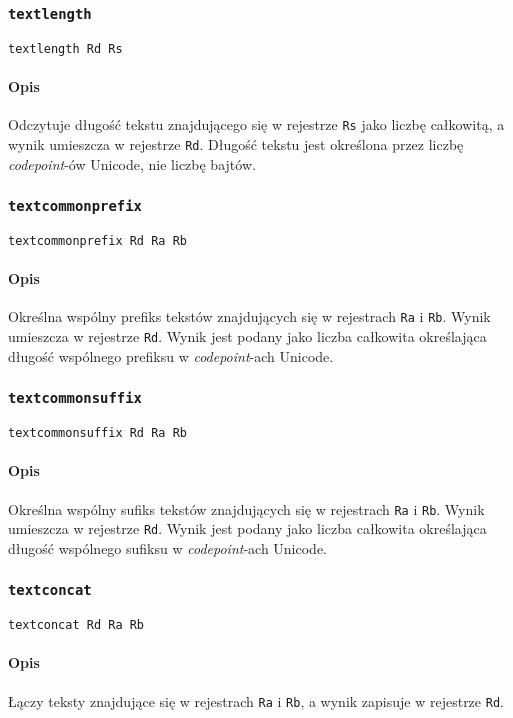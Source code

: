\subsubsection{\texttt{textlength}}

\begin{lstlisting}
textlength Rd Rs
\end{lstlisting}

\paragraph*{Opis} Odczytuje długość tekstu znajdującego się w rejestrze
\texttt{Rs} jako liczbę całkowitą, a wynik umieszcza w rejestrze \texttt{Rd}.
Długość tekstu jest określona przez liczbę \emph{codepoint}-ów Unicode, nie
liczbę bajtów.

\subsubsection{\texttt{textcommonprefix}}

\begin{lstlisting}
textcommonprefix Rd Ra Rb
\end{lstlisting}

\paragraph*{Opis} Określna wspólny prefiks tekstów znajdujących się w rejestrach
\texttt{Ra} i \texttt{Rb}. Wynik umieszcza w rejestrze \texttt{Rd}. Wynik jest
podany jako liczba całkowita określająca długość wspólnego prefiksu w
\emph{codepoint}-ach Unicode.

\subsubsection{\texttt{textcommonsuffix}}

\begin{lstlisting}
textcommonsuffix Rd Ra Rb
\end{lstlisting}

\paragraph*{Opis} Określna wspólny sufiks tekstów znajdujących się w rejestrach
\texttt{Ra} i \texttt{Rb}. Wynik umieszcza w rejestrze \texttt{Rd}. Wynik jest
podany jako liczba całkowita określająca długość wspólnego sufiksu w
\emph{codepoint}-ach Unicode.

\subsubsection{\texttt{textconcat}}

\begin{lstlisting}
textconcat Rd Ra Rb
\end{lstlisting}

\paragraph*{Opis} Łączy teksty znajdujące się w rejestrach \texttt{Ra} i
\texttt{Rb}, a wynik zapisuje w rejestrze \texttt{Rd}.
